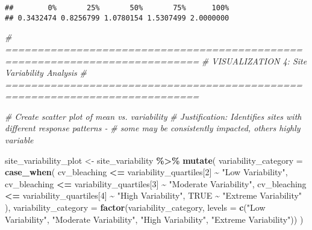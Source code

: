 \documentclass[
]{article}
\newenvironment{Shaded}{\begin{snugshade}}{\end{snugshade}}
\newcommand{\AttributeTok}[1]{\textcolor[rgb]{0.13,0.29,0.53}{#1}}
\newcommand{\CommentTok}[1]{\textcolor[rgb]{0.56,0.35,0.01}{\textit{#1}}}
\newcommand{\ConstantTok}[1]{\textcolor[rgb]{0.56,0.35,0.01}{#1}}
\newcommand{\DecValTok}[1]{\textcolor[rgb]{0.00,0.00,0.81}{#1}}
\newcommand{\FunctionTok}[1]{\textcolor[rgb]{0.13,0.29,0.53}{\textbf{#1}}}
\newcommand{\NormalTok}[1]{#1}
\newcommand{\OtherTok}[1]{\textcolor[rgb]{0.56,0.35,0.01}{#1}}
\newcommand{\SpecialCharTok}[1]{\textcolor[rgb]{0.81,0.36,0.00}{\textbf{#1}}}
\newcommand{\StringTok}[1]{\textcolor[rgb]{0.31,0.60,0.02}{#1}}
\begin{document}
\begin{verbatim}
##        0%       25%       50%       75%      100% 
## 0.3432474 0.8256799 1.0780154 1.5307499 2.0000000
\end{verbatim}

\begin{Shaded}
\begin{Highlighting}[]
\CommentTok{\# ============================================================================}
\CommentTok{\# VISUALIZATION 4: Site Variability Analysis}
\CommentTok{\# ============================================================================}

\CommentTok{\# Create scatter plot of mean vs. variability}
\CommentTok{\# Justification: Identifies sites with different response patterns {-} }
\CommentTok{\# some may be consistently impacted, others highly variable}

\NormalTok{site\_variability\_plot }\OtherTok{\textless{}{-}}\NormalTok{ site\_variability }\SpecialCharTok{\%\textgreater{}\%}
  \FunctionTok{mutate}\NormalTok{(}
    \AttributeTok{variability\_category =} \FunctionTok{case\_when}\NormalTok{(}
\NormalTok{      cv\_bleaching }\SpecialCharTok{\textless{}=}\NormalTok{ variability\_quartiles[}\DecValTok{2}\NormalTok{] }\SpecialCharTok{\textasciitilde{}} \StringTok{"Low Variability"}\NormalTok{,}
\NormalTok{      cv\_bleaching }\SpecialCharTok{\textless{}=}\NormalTok{ variability\_quartiles[}\DecValTok{3}\NormalTok{] }\SpecialCharTok{\textasciitilde{}} \StringTok{"Moderate Variability"}\NormalTok{,}
\NormalTok{      cv\_bleaching }\SpecialCharTok{\textless{}=}\NormalTok{ variability\_quartiles[}\DecValTok{4}\NormalTok{] }\SpecialCharTok{\textasciitilde{}} \StringTok{"High Variability"}\NormalTok{, }
      \ConstantTok{TRUE} \SpecialCharTok{\textasciitilde{}} \StringTok{"Extreme Variability"}
\NormalTok{    ),}
    \AttributeTok{variability\_category =} \FunctionTok{factor}\NormalTok{(variability\_category, }
                                  \AttributeTok{levels =} \FunctionTok{c}\NormalTok{(}\StringTok{"Low Variability"}\NormalTok{, }\StringTok{"Moderate Variability"}\NormalTok{, }
                                             \StringTok{"High Variability"}\NormalTok{, }\StringTok{"Extreme Variability"}\NormalTok{))}
\NormalTok{  )}


\end{Highlighting}
\end{Shaded}
\end{document}
